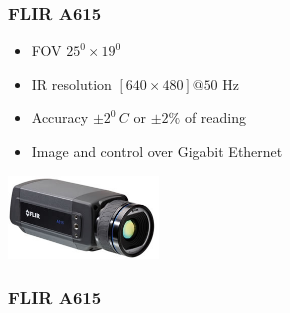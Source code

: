 \begin{frame}
 \frametitle{FLIR A615}
\begin{itemize}
  \item FOV $25^0 \times 19^0$
  \item IR resolution $[640 \times 480]@50$ Hz
  \item Accuracy $\pm 2^0\,C$ or $\pm 2\%$ of reading
  \item Image and control over Gigabit Ethernet
\end{itemize}

\vspace{5ex}\hspace{37ex}\includegraphics[width=4cm]{img/A615_300.jpg}
\end{frame}

\begin{frame}
 \frametitle{FLIR A615}
\end{frame}

